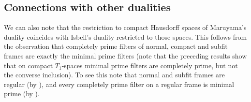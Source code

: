 \documentclass{article}
\theoremstyle{plain}
\theoremstyle{definition}
\newtheorem{notation}[theorem]{Notation}
\theoremstyle{remark}
\newcommand{\0}{\mathbbm 0}
\newcommand{\1}{\mathbbm 1}
\newcommand{\2}{\mathbbm 2}
\begin{document}



\subsection{Connections with other dualities}

We can also note that the restriction to compact Hausdorff spaces of Maruyama's duality coincides with Isbell's duality restricted to those spaces. This  follows from the observation that completely prime filters of normal, compact and subfit frames are exactly the minimal prime filters (note that the preceding results show that on compact $T_1$-spaces minimal prime filters are completely prime, but not the converse inclusion). To see this note that normal and subfit frames are regular (by \cite[Prop. 5.9.2]{picado2011frames}), and every completely prime filter on a regular frame is minimal prime (by \cite[Lemma 5.3]{bezhanishvili}). \\

\end{document}
